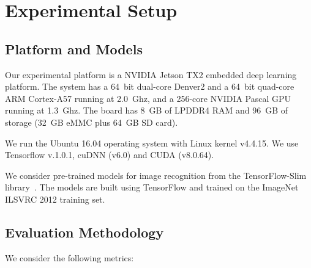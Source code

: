 \section{Experimental Setup \label{sec:setup}}
\subsection{Platform and Models\label{sec:platform}}
 Our experimental platform is a NVIDIA Jetson TX2 embedded deep learning platform. The system has a 64~bit dual-core
Denver2 and a 64~bit quad-core ARM Cortex-A57 running at 2.0~Ghz, and a 256-core NVIDIA Pascal GPU running at 1.3~Ghz. The board has 8~GB
of LPDDR4 RAM and 96~GB of storage (32~GB eMMC plus 64~GB SD card).


 We run the Ubuntu 16.04 operating system with Linux kernel v4.4.15. We use Tensorflow v.1.0.1, cuDNN (v6.0)
and CUDA (v8.0.64).


 We consider  pre-trained \CNN models for image recognition from the TensorFlow-Slim
library~\cite{silberman2013tensorflow}. The models are built using TensorFlow and trained on the ImageNet ILSVRC 2012 training set.


\subsection{Evaluation Methodology \label{sec:method}}


 We consider the following metrics:

